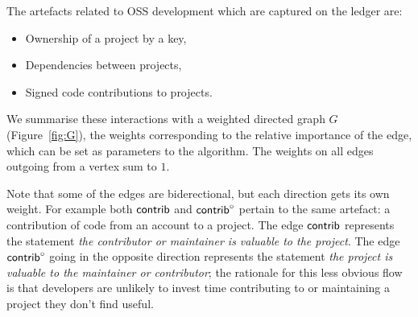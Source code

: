 The artefacts related to OSS development which are captured on the \oscoin{}
ledger are:
\begin{itemize}
  \item Ownership of a project by a key,
  \item Dependencies between projects,
  \item Signed code contributions to projects.
\end{itemize}
We summarise these interactions with a weighted directed graph $G$
(Figure~\ref{fig:G}), the weights corresponding to the relative importance of
the edge, which can be set as parameters to the algorithm.  The weights on all
edges outgoing from a vertex sum to $1$.

\begin{center}
\end{center}
\medskip


\noindent Note that some of the edges are biderectional, but each direction gets
its own weight. For example both $\mathsf{contrib}$ and $\mathsf{contrib}^\circ$ pertain to
the same artefact: a contribution of code from an account to a
project. The edge $\mathsf{contrib}$ represents the statement \emph{the contributor
or maintainer is valuable to the project}. The edge $\mathsf{contrib}^\circ$ going in the
opposite direction represents the statement \emph{the project is
valuable to the maintainer or contributor}; the rationale for this less obvious flow is
that developers are unlikely to invest time contributing to or maintaining a project they
don't find useful.


